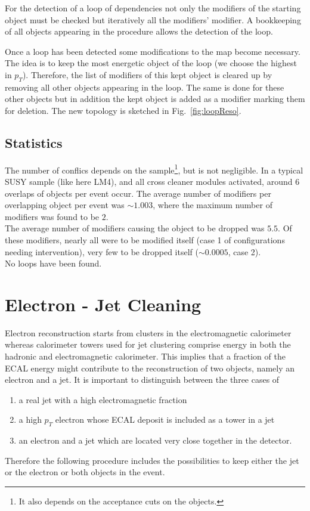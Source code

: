 \documentclass{cmspaper}
\begin{document}
For the detection of a loop of dependencies not only the modifiers of the
starting object must be checked but iteratively all the modifiers' modifier. A
bookkeeping of all objects appearing in the procedure allows the detection of
the loop.

Once a loop has been detected some modifications to the map become necessary.
The idea is to keep the most energetic object of the loop (we choose the
highest in $p_T$). Therefore, the list of modifiers of this kept object is
cleared up by removing all other objects appearing in the loop.  The same is
done for these other objects but in addition the kept object is added as a
modifier marking them for deletion. The new topology is sketched in
Fig.~\ref{fig:loopReso}.

\subsection{Statistics}
The number of conflics depends on the sample\footnote{It also depends on the acceptance cuts on the objects.}, but is not negligible. In a typical SUSY sample (like here LM4), and all cross cleaner modules activated, around \(6\) overlaps of objects per event occur. The average number of modifiers per overlapping object per event was \( \sim 1.003\), where the maximum number of modifiers was found to be \(2\). \\
The average number of modifiers causing the object to be dropped was \(5.5\). Of these modifiers, nearly all were to be modified itself (case 1 of configurations needing intervention), very few to be dropped itself (\(\sim 0.0005\), case 2).\\
No loops have been found.


\section{Electron - Jet Cleaning}
\label{sec:ElecJet}
Electron reconstruction starts from clusters in the electromagnetic calorimeter
whereas calorimeter towers used for jet clustering comprise energy in both the
hadronic and electromagnetic calorimeter. This implies that a fraction of the
ECAL energy might contribute to the reconstruction of two objects, namely an
electron and a jet. It is important to distinguish between the three cases of
\begin{enumerate}
\item a real jet with a high electromagnetic fraction
\item a high $p_T$ electron whose ECAL deposit is included as a tower in a jet
\item an electron and a jet which are located very close together in the
    detector.
\end{enumerate}
Therefore the following procedure includes the possibilities to keep either the
jet or the electron or both objects in the event.
\end{document}
